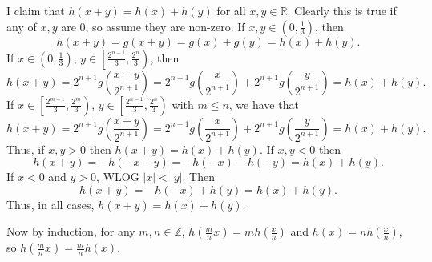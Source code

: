 I claim that $h\left(x+y\right)=h\left(x\right)+h\left(y\right)$ for all $x,y\in\mathbb{R}$. Clearly this is true if any of $x,y$ are $0$, so assume they are non-zero. If $x,y\in\left(0,\frac{1}{3}\right)$, then \[h\left(x+y\right)=g\left(x+y\right)=g\left(x\right)+g\left(y\right)=h\left(x\right)+h\left(y\right).\] If $x\in\left(0,\frac{1}{3}\right)$, $y\in\left[\frac{2^{n-1}}{3},\frac{2^n}{3}\right)$, then \[h\left(x+y\right)=2^{n+1}g\left(\frac{x+y}{2^{n+1}}\right)=2^{n+1}g\left(\frac{x}{2^{n+1}}\right)+2^{n+1}g\left(\frac{y}{2^{n+1}}\right)=h\left(x\right)+h\left(y\right).\] If $x\in\left[\frac{2^{m-1}}{3},\frac{2^m}{3}\right)$, $y\in\left[\frac{2^{n-1}}{3},\frac{2^n}{3}\right)$ with $m\leq n$, we have that \[h\left(x+y\right)=2^{n+1}g\left(\frac{x+y}{2^{n+1}}\right)=2^{n+1}g\left(\frac{x}{2^{n+1}}\right)+2^{n+1}g\left(\frac{y}{2^{n+1}}\right)=h\left(x\right)+h\left(y\right).\] Thus, if $x,y>0$ then $h\left(x+y\right)=h\left(x\right)+h\left(y\right)$. If $x,y<0$ then \[h\left(x+y\right)=-h\left(-x-y\right)=-h\left(-x\right)-h\left(-y\right)=h\left(x\right)+h\left(y\right).\] If $x<0$ and $y>0$, WLOG $\left|x\right|<\left|y\right|$. Then \[h\left(x+y\right)=-h\left(-x\right)+h\left(y\right)=h\left(x\right)+h\left(y\right).\] Thus, in all cases, $h\left(x+y\right)=h\left(x\right)+h\left(y\right)$.

Now by induction, for any $m,n\in\mathbb{Z}$, $h\left(\frac{m}{n}x\right)=mh\left(\frac{x}{n}\right)$ and $h\left(x\right)=nh\left(\frac{x}{n}\right)$, so $h\left(\frac{m}{n}x\right)=\frac{m}{n}h\left(x\right)$.

